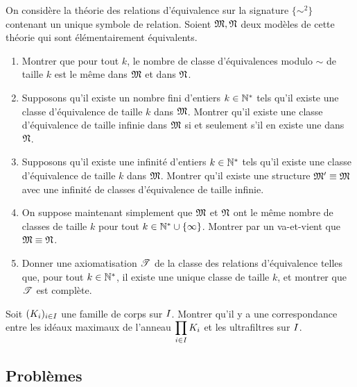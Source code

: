 \begin{exercise}
  On considère la théorie des relations d'équivalence sur la signature
  $\{\sim^2\}$ contenant un unique symbole de relation. Soient $\mathfrak{M},\mathfrak{N}$
  deux modèles de cette théorie qui sont élémentairement équivalents.
  \begin{enumerate}[label=(\roman*)]
  \item Montrer que pour tout $k$, le nombre de classe d'équivalences modulo
    $\sim$ de taille $k$ est le même dans $\mathfrak{M}$ et dans $\mathfrak{N}$.
  \item Supposons qu'il existe un nombre fini d'entiers $k\in\mathbb N^*$ tels qu'il
    existe une classe d'équivalence de taille $k$ dans $\mathfrak{M}$. Montrer qu'il
    existe une classe d'équivalence de taille infinie dans $\mathfrak{M}$ si et
    seulement s'il en existe une dans $\mathfrak{N}$.
  \item Supposons qu'il existe une infinité d'entiers $k\in\mathbb N^*$ tels qu'il
    existe une classe d'équivalence de taille $k$ dans $\mathfrak{M}$. Montrer qu'il
    existe une structure $\mathfrak{M}' \equiv \mathfrak{M}$ avec une infinité de classes
    d'équivalence de taille infinie.
  \item On suppose maintenant simplement que $\mathfrak{M}$ et $\mathfrak{N}$ ont le même
    nombre de classes de taille $k$ pour tout $k\in\mathbb N^*\cup\{\infty\}$. Montrer
    par un va-et-vient que $\mathfrak{M}\equiv\mathfrak{N}$.
  \item Donner une axiomatisation $\mathscr T$ de la classe des relations
    d'équivalence telles que, pour tout $k\in\mathbb N^*$, il existe une unique classe
    de taille $k$, et montrer que $\mathscr T$ est complète.
  \end{enumerate}
\end{exercise}

\begin{exercise}
  Soit $(K_i)_{i\in I}$ une famille de corps sur $I$. Montrer
  qu'il y a une correspondance entre les idéaux maximaux de l'anneau
  $\displaystyle\prod_{i \in I} K_i$ et les ultrafiltres sur $I$.
\end{exercise}

\clearpage

\subsection{Problèmes}

